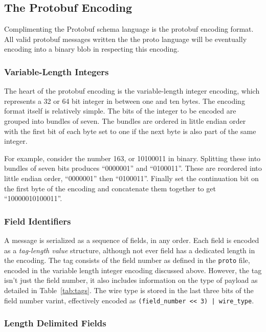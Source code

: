 \documentclass[11pt]{article}
\theoremstyle{definition}
\begin{document}
\subsection{The Protobuf Encoding}\label{sec:proto-enc}

Complimenting the Protobuf schema language is the protobuf encoding format. All
valid protobuf messages written the the proto language will be eventually
encoding into a binary blob in respecting this encoding.

\subsubsection{Variable-Length Integers}

The heart of the protobuf encoding is the variable-length integer encoding,
which represents a 32 or 64 bit integer in between one and ten bytes. The
encoding format itself is relatively simple. The bits of the integer to be
encoded are grouped into bundles of seven. The bundles are ordered in little
endian order with the first bit of each byte set to one if the next byte is also
part of the same integer.

For example, consider the number 163, or 10100011 in binary. Splitting these
into bundles of seven bits produces ``0000001'' and ``0100011''. These are
reordered into little endian order, ``0000001'' then ``0100011''. Finally set
the continuation bit on the first byte of the encoding and concatenate them
together to get ``10000010100011''.

\subsubsection{Field Identifiers}

A message is serialized as a sequence of fields, in any order. Each field is
encoded as a \emph{tag-length value} structure, although not ever field has a
dedicated length in the encoding. The tag consists of the field number as
defined in the \texttt{proto} file, encoded in the variable length integer
encoding discussed above. However, the tag isn't just the field number, it also
includes information on the type of payload as detailed in
Table~\ref{tab:tags}. The wire type is stored in the last three bits of the
field number varint, effectively encoded as \texttt{(field\_number << 3) |
  wire\_type}. 

\subsubsection{Length Delimited Fields}
\end{document}
